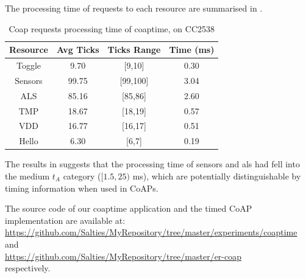 The processing time of requests to each resource are summarised in .

\begin{table}[ht!]
	\center
	\begin{tabular}{|c|c|c|c|}
		\hline
		Resource & Avg Ticks & Ticks Range & Time (ms) \\ \hline
		Toggle   & 9.70	&[9,10]                          & 0.30                 \\ \hline
		Sensors  & 99.75	&[99,100]                         & 3.04                 \\ \hline
		ALS      & 85.16	&[85,86]                         & 2.60                 \\ \hline
		TMP      & 18.67	&[18,19]                         & 0.57                 \\ \hline
		VDD      & 16.77	&[16,17]                         & 0.51                 \\ \hline
		Hello    & 6.30	&[6,7]                          & 0.19                 \\ \hline
	\end{tabular}
	\caption{Coap requests processing time of coaptime, on CC2538}
	\label{Tbl: Coap requests processing time of coaptime}
\end{table}

The results in  suggests that the processing time of sensors and als had fell into the medium $t_A$ category ($[1.5, 25)$ ms), which are potentially distinguishable by timing information when used in CoAPs.

The source code of our coaptime application and the timed CoAP implementation are available at: \\
\url{https://github.com/Salties/MyRepository/tree/master/experiments/coaptime}\\
and \\
\url{https://github.com/Salties/MyRepository/tree/master/er-coap} \\
respectively.

